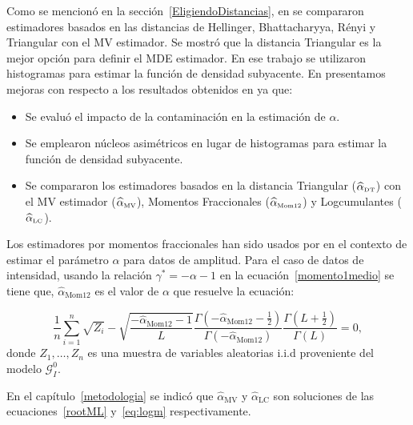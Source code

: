 Como se mencionó en la sección~\ref{EligiendoDistancias}, en \citet{APSAR2013ParameterEstimationStochasticDistances} se compararon estimadores basados en las distancias de Hellinger, Bhattacharyya, Rényi y Triangular con el MV estimador. 
Se mostró que la distancia Triangular es la mejor opción para definir el MDE estimador. 
En ese trabajo se utilizaron histogramas para estimar la función de densidad subyacente. 
En \citet{gambini2015} %
presentamos mejoras con respecto a los resultados obtenidos en \citet{APSAR2013ParameterEstimationStochasticDistances} ya que: 
\begin{itemize}
	\item Se evaluó el impacto de la contaminación en la estimación de $\alpha$.
	\item Se emplearon núcleos asimétricos en lugar de histogramas para estimar la función de densidad subyacente.
	\item Se compararon los estimadores basados en la distancia Triangular ($\widehat{\alpha}_{\text{\tiny{DT}}}$) con el MV estimador ($\widehat{\alpha}_{\text{\tiny{MV}}}$), Momentos Fraccionales ($\widehat{\alpha}_{\text{\tiny{Mom12}}}$) y Logcumulantes ($\widehat{\alpha}_{\text{\tiny{LC}}}$). 
\end{itemize}

Los estimadores por momentos fraccionales han sido usados por \citet{Frery97,GambiniSC08} en el contexto de estimar el parámetro $\alpha$ para datos de amplitud. Para el caso de datos de intensidad, usando la relación $\gamma^*=-\alpha-1$ en la ecuación~\eqref{momento1medio} se tiene que, $\widehat{\alpha}_\text{Mom12}$ es el valor de $\alpha$ que resuelve la ecuación:

\begin{equation}
\frac{1}{n} \sum_{i=1}^n \sqrt{Z_i} -\sqrt{\frac{-\widehat\alpha_{\text{Mom12}}-1}{L}}\frac{\Gamma ( -\widehat\alpha_{\text{Mom12}}-{\frac{1}{2}} )}{ \Gamma (-\widehat\alpha_{\text{Mom12}}) }
\frac{\Gamma (L+{\frac{1}{2}} )}{\Gamma (L)}=0,
\label{estim_moment1_2_gI0}
\end{equation}
donde $Z_1,\ldots,Z_n$ es una muestra de variables aleatorias i.i.d proveniente del modelo $\mathcal{G}_I^0$.

En el capítulo~\ref{metodologia} se indicó que $\widehat{\alpha}_\text{MV}$ y $\widehat{\alpha}_\text{LC}$ son soluciones de las ecuaciones~\eqref{rootML} y~\eqref{eq:logm} respectivamente.

